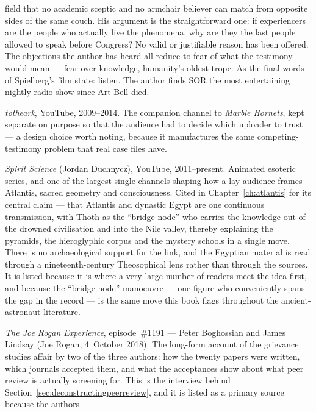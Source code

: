 \begin{list}{}{\setlength{\leftmargin}{1.2em}\setlength{\itemindent}{-1.2em}
\setlength{\itemsep}{3pt}}
field that no academic sceptic and no armchair believer can match from opposite sides of the same
couch. His argument is the straightforward one: if experiencers are the people who actually live
the phenomena, why are they the last people allowed to speak before Congress? No valid or
justifiable reason has been offered. The objections the author has heard all reduce to fear of
what the testimony would mean --- fear over knowledge, humanity's oldest trope. As the final
words of Spielberg's film state: listen. The author finds SOR the most entertaining nightly
radio show since Art Bell died.
\item \emph{totheark}, YouTube, 2009--2014. The companion channel to \emph{Marble Hornets}, kept
separate on purpose so that the audience had to decide which uploader to trust --- a design choice
worth noting, because it manufactures the same competing-testimony problem that real case files
have.
\item \emph{Spirit Science} (Jordan Duchnycz), YouTube, 2011--present. Animated esoteric series, and
one of the largest single channels shaping how a lay audience frames Atlantis, sacred geometry and
consciousness. Cited in Chapter~\ref{ch:atlantis} for its central claim --- that Atlantis and
dynastic Egypt are one continuous transmission, with Thoth as the ``bridge node'' who carries the
knowledge out of the drowned civilisation and into the Nile valley, thereby explaining the
pyramids, the hieroglyphic corpus and the mystery schools in a single move. There is no
archaeological support for the link, and the Egyptian material is read through a nineteenth-century
Theosophical lens rather than through the sources. It is listed because it is where a very large
number of readers meet the idea first, and because the ``bridge node'' manoeuvre --- one figure who
conveniently spans the gap in the record --- is the same move this book flags throughout the
ancient-astronaut literature.
\item \emph{The Joe Rogan Experience}, episode~\#1191 --- Peter Boghossian and James Lindsay (Joe
Rogan, 4~October 2018). The long-form account of the grievance studies affair by two of the three
authors: how the twenty papers were written, which journals accepted them, and what the acceptances
show about what peer review is actually screening for. This is the interview behind
Section~\ref{sec:deconstructingpeerreview}, and it is listed as a primary source because the authors

\end{list}
